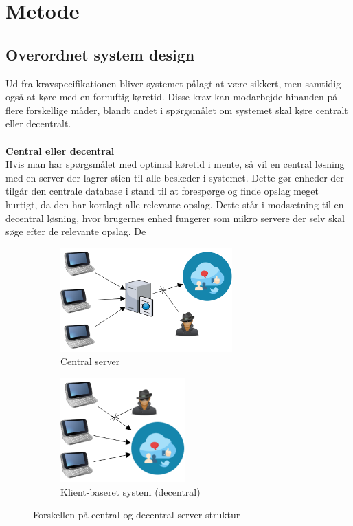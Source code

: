 \section{Metode}
\subsection{Overordnet system design}
Ud fra kravspecifikationen bliver systemet pålagt at være sikkert, men samtidig også at køre med en fornuftig køretid. Disse krav kan  modarbejde hinanden på flere forskellige måder, blandt andet i spørgsmålet om systemet skal køre centralt eller decentralt.
\\\\
\textbf{Central eller decentral}\\
Hvis man har spørgsmålet med optimal køretid i mente, så vil en central løsning med en server der lagrer stien til alle beskeder i systemet. Dette gør enheder der tilgår den centrale database i stand til at forespørge og finde opslag meget hurtigt, da den har kortlagt alle relevante opslag. Dette står i modsætning til en decentral løsning, hvor brugernes enhed fungerer som mikro servere der selv skal søge efter de relevante opslag. De 

\begin{figure}[H]
    \begin{subfigure}{0.5\textwidth}
        \centering
        \includegraphics[width=1\linewidth, height=4cm]{Projectdoc/Assets/Illustrationer/Security_diagram_1.png} 
        \caption{Central server}
        \label{fig:central_server}
    \end{subfigure}
    \begin{subfigure}{0.5\textwidth}
        \centering
        \includegraphics[width=0.7\linewidth, height=4cm]{Projectdoc/Assets/Illustrationer/Security_diagram_2.png}
        \caption{Klient-baseret system (decentral)}
        \label{fig:decentral_server}
    \end{subfigure}
    \caption{Forskellen på central og decentral server struktur}
    \label{fig:serverstruktur}
\end{figure}

